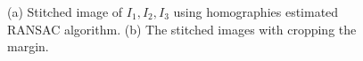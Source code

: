 \documentclass[10pt]{article}
\begin{document}
\begin{figure}[!h]
    \begin{center}
    \end{center}
    \caption{(a) Stitched image of $I_1, I_2, I_3$ using homographies estimated RANSAC algorithm. (b) The stitched images with cropping the margin.}
    \label{fig5}
\end{figure}



\end{document}
